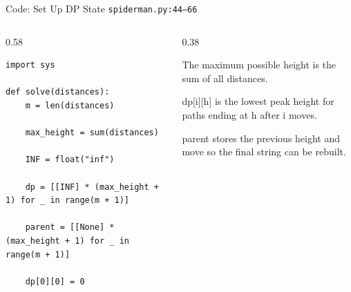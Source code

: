 \documentclass[aspectratio=169,11pt]{beamer}
\begin{document}
\begin{frame}[fragile]{Code: Set Up DP State}
\scriptsize
{} \texttt{spiderman.py:44--66}

\vspace{0.08cm}
\begin{columns}[T,totalwidth=\textwidth]
\begin{column}{0.58\textwidth}
\begin{lstlisting}[style=cpcode]
import sys

def solve(distances):
    m = len(distances)

    max_height = sum(distances)

    INF = float("inf")

    dp = [[INF] * (max_height + 1) for _ in range(m + 1)]

    parent = [[None] * (max_height + 1) for _ in range(m + 1)]

    dp[0][0] = 0
\end{lstlisting}
\end{column}
\begin{column}{0.38\textwidth}
\begin{tightitemize}
  \item The maximum possible height is the sum of all distances.
  \item dp[i][h] is the lowest peak height for paths ending at h after i moves.
  \item parent stores the previous height and move so the final string can be rebuilt.
\end{tightitemize}
\end{column}
\end{columns}
\end{frame}
\end{document}

